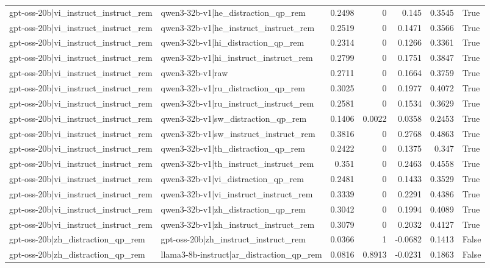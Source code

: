 \begin{table}
\begin{tabular}{l l r r r r l}
gpt-oss-20b|vi_instruct_instruct_rem & qwen3-32b-v1|he_distraction_qp_rem & 0.2498 & 0 & 0.145 & 0.3545 & True \\
gpt-oss-20b|vi_instruct_instruct_rem & qwen3-32b-v1|he_instruct_instruct_rem & 0.2519 & 0 & 0.1471 & 0.3566 & True \\
gpt-oss-20b|vi_instruct_instruct_rem & qwen3-32b-v1|hi_distraction_qp_rem & 0.2314 & 0 & 0.1266 & 0.3361 & True \\
gpt-oss-20b|vi_instruct_instruct_rem & qwen3-32b-v1|hi_instruct_instruct_rem & 0.2799 & 0 & 0.1751 & 0.3847 & True \\
gpt-oss-20b|vi_instruct_instruct_rem & qwen3-32b-v1|raw & 0.2711 & 0 & 0.1664 & 0.3759 & True \\
gpt-oss-20b|vi_instruct_instruct_rem & qwen3-32b-v1|ru_distraction_qp_rem & 0.3025 & 0 & 0.1977 & 0.4072 & True \\
gpt-oss-20b|vi_instruct_instruct_rem & qwen3-32b-v1|ru_instruct_instruct_rem & 0.2581 & 0 & 0.1534 & 0.3629 & True \\
gpt-oss-20b|vi_instruct_instruct_rem & qwen3-32b-v1|sw_distraction_qp_rem & 0.1406 & 0.0022 & 0.0358 & 0.2453 & True \\
gpt-oss-20b|vi_instruct_instruct_rem & qwen3-32b-v1|sw_instruct_instruct_rem & 0.3816 & 0 & 0.2768 & 0.4863 & True \\
gpt-oss-20b|vi_instruct_instruct_rem & qwen3-32b-v1|th_distraction_qp_rem & 0.2422 & 0 & 0.1375 & 0.347 & True \\
gpt-oss-20b|vi_instruct_instruct_rem & qwen3-32b-v1|th_instruct_instruct_rem & 0.351 & 0 & 0.2463 & 0.4558 & True \\
gpt-oss-20b|vi_instruct_instruct_rem & qwen3-32b-v1|vi_distraction_qp_rem & 0.2481 & 0 & 0.1433 & 0.3529 & True \\
gpt-oss-20b|vi_instruct_instruct_rem & qwen3-32b-v1|vi_instruct_instruct_rem & 0.3339 & 0 & 0.2291 & 0.4386 & True \\
gpt-oss-20b|vi_instruct_instruct_rem & qwen3-32b-v1|zh_distraction_qp_rem & 0.3042 & 0 & 0.1994 & 0.4089 & True \\
gpt-oss-20b|vi_instruct_instruct_rem & qwen3-32b-v1|zh_instruct_instruct_rem & 0.3079 & 0 & 0.2032 & 0.4127 & True \\
gpt-oss-20b|zh_distraction_qp_rem & gpt-oss-20b|zh_instruct_instruct_rem & 0.0366 & 1 & -0.0682 & 0.1413 & False \\
gpt-oss-20b|zh_distraction_qp_rem & llama3-8b-instruct|ar_distraction_qp_rem & 0.0816 & 0.8913 & -0.0231 & 0.1863 & False \\

\end{tabular}
\end{table}
